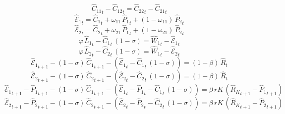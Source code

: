 \begin{dmath}
{{\hat{C}_{1 1}}}_{t}-{{\hat{C}_{1 2}}}_{t}={{\hat{C}_{2 2}}}_{t}-{{\hat{C}_{2 1}}}_{t}
\end{dmath}
\begin{dmath}
{{\hat{\mathscr{E}}_{1}}}_{t}={{\hat{C}_{1}}}_{t}+{{\omega_{11}}}\, {{\hat{P}_{1}}}_{t}+\left(1-{{\omega_{11}}}\right)\, {{\hat{P}_{2}}}_{t}
\end{dmath}
\begin{dmath}
{{\hat{\mathscr{E}}_{2}}}_{t}={{\hat{C}_{2}}}_{t}+{{\omega_{21}}}\, {{\hat{P}_{1}}}_{t}+\left(1-{{\omega_{21}}}\right)\, {{\hat{P}_{2}}}_{t}
\end{dmath}
\begin{dmath}
{{\varphi}}\, {{\hat{L}_{1}}}_{t}-{{\hat{C}_{1}}}_{t}\, \left(1-{{\sigma}}\right)={{\hat{W}_{1}}}_{t}-{{\hat{\mathscr{E}}_{1}}}_{t}
\end{dmath}
\begin{dmath}
{{\varphi}}\, {{\hat{L}_{2}}}_{t}-{{\hat{C}_{2}}}_{t}\, \left(1-{{\sigma}}\right)={{\hat{W}_{1}}}_{t}-{{\hat{\mathscr{E}}_{2}}}_{t}
\end{dmath}
\begin{dmath}
{{\hat{\mathscr{E}}_{1}}}_{t+1}-\left(1-{{\sigma}}\right)\, {{\hat{C}_{1}}}_{t+1}-\left({{\hat{\mathscr{E}}_{1}}}_{t}-{{\hat{C}_{1}}}_{t}\, \left(1-{{\sigma}}\right)\right)=\left(1-{{\beta}}\right)\, {{\hat{R}}}_{t}
\end{dmath}
\begin{dmath}
{{\hat{\mathscr{E}}_{2}}}_{t+1}-\left(1-{{\sigma}}\right)\, {{\hat{C}_{2}}}_{t+1}-\left({{\hat{\mathscr{E}}_{2}}}_{t}-{{\hat{C}_{2}}}_{t}\, \left(1-{{\sigma}}\right)\right)=\left(1-{{\beta}}\right)\, {{\hat{R}}}_{t}
\end{dmath}
\begin{dmath}
{{\hat{\mathscr{E}}_{1}}}_{t+1}-{{\hat{P}_{1}}}_{t+1}-\left(1-{{\sigma}}\right)\, {{\hat{C}_{1}}}_{t+1}-\left({{\hat{\mathscr{E}}_{1}}}_{t}-{{\hat{P}_{1}}}_{t}-{{\hat{C}_{1}}}_{t}\, \left(1-{{\sigma}}\right)\right)={{\beta}}\, {rK}\, \left({{\hat{R}_{K}}}_{t+1}-{{\hat{P}_{1}}}_{t+1}\right)
\end{dmath}
\begin{dmath}
{{\hat{\mathscr{E}}_{2}}}_{t+1}-{{\hat{P}_{2}}}_{t+1}-\left(1-{{\sigma}}\right)\, {{\hat{C}_{2}}}_{t+1}-\left({{\hat{\mathscr{E}}_{2}}}_{t}-{{\hat{P}_{2}}}_{t}-{{\hat{C}_{2}}}_{t}\, \left(1-{{\sigma}}\right)\right)={{\beta}}\, {rK}\, \left({{\hat{R}_{K}}}_{t+1}-{{\hat{P}_{2}}}_{t+1}\right)
\end{dmath}

